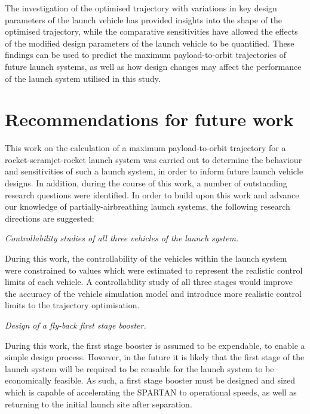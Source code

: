 The investigation of the optimised trajectory with variations in key design parameters of the launch vehicle has provided insights into the shape of the optimised trajectory, while the comparative sensitivities have allowed the effects of the modified design parameters of the launch vehicle to be quantified. These findings can be used to predict the maximum payload-to-orbit trajectories of future launch systems, as well as how design changes may affect the performance of the launch system utilised in this study. 

  \chapter{Recommendations for future work}
 This work on the calculation of a maximum payload-to-orbit trajectory for a rocket-scramjet-rocket launch system was carried out to determine the behaviour and sensitivities of such a launch system, in order to inform future launch vehicle designs. 
 In addition, during the course of this work, a number of outstanding research questions were identified.
 In order to build upon this work and advance our knowledge of partially-airbreathing launch systems, the following research directions are suggested:

\vspace{10pt}
\textit{Controllability studies of all three vehicles of the launch system.}

 \noindent
During this work, the controllability of the vehicles within the launch system were constrained to values which were estimated to represent the realistic control limits of each vehicle. 
A controllability study of all three stages would improve the accuracy of the vehicle simulation model and introduce more realistic control limits to the trajectory optimisation. 

\vspace{10pt}
 \textit{Design of a fly-back first stage booster.}
 
 \noindent
 During this work, the first stage booster is assumed to be expendable, to enable a simple design process. However, in the future it is likely that the first stage of the launch system will be required to be reusable for the launch system to be economically feasible. As such, a first stage booster must be designed and sized which is capable of accelerating the SPARTAN to operational speeds, as well as returning to the initial launch site after separation. 


